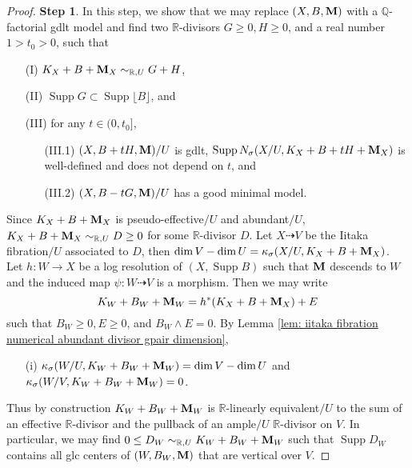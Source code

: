 \documentclass[11pt]{amsart}
\numberwithin{equation}{section}
\newcommand{\Mm}{{\bf{M}}}
\newcommand{\Qq}{\mathbb{Q}}
\newcommand{\Rr}{\mathbb{R}}
\newcommand{\Supp}{\operatorname{Supp}}
\theoremstyle{definition}
\theoremstyle{definition}
\theoremstyle{definition}
\begin{document}
\begin{proof}

\noindent\textbf{Step 1}. In this step, we show that we may replace $(X,B,\Mm)$ with a $\Qq$-factorial gdlt model and find two $\Rr$-divisors $G\geq 0,H\geq 0$, and a real number $1>t_0>0$, such that
\begin{itemize}
    \item[(I)] $K_X+B+\Mm_X\sim_{\Rr,U}G+H$,
    \item[(II)] $\Supp G\subset\Supp\lfloor B\rfloor$, and
    \item[(III)] for any $t\in (0,t_0]$,
    \begin{enumerate}
        \item[(III.1)] $(X,B+tH,\Mm)/U$ is gdlt, $\Supp N_{\sigma}(X/U,K_X+B+tH+\Mm_X)$ is well-defined and does not depend on $t$, and
        \item[(III.2)] $(X,B-tG,\Mm)/U$ has a good minimal model.
    \end{enumerate}
\end{itemize}

Since $K_X+B+\Mm_X$ is pseudo-effective$/U$ and abundant$/U$,  $K_{X}+B+\Mm_{X}\sim_{\Rr,U}D\geq 0$ for some $\Rr$-divisor $D$. Let $X\dashrightarrow V$ be the Iitaka fibration$/U$ associated to $D$, then $\dim V-\dim U=\kappa_{\sigma}(X/U,K_X+B+\Mm_X)$. Let $h: W\rightarrow X$ be a log resolution of $(X,\Supp B)$ such that $\Mm$ descends to $W$ and the induced map $\psi: W\dashrightarrow V$ is a morphism. Then we may write
$$K_W+B_W+\Mm_W=h^*(K_X+B+\Mm_X)+E$$
such that $B_W\geq 0,E\geq 0$, and $B_W\wedge E=0$. By Lemma \ref{lem: iitaka fibration numerical abundant divisor gpair dimension}, 
\begin{itemize}
    \item[(i)]  $\kappa_{\sigma}(W/U,K_{W}+B_W+\Mm_W)=\dim V-\dim U$ and $\kappa_{\sigma}(W/V,K_{W}+B_W+\Mm_{W})=0$. 
\end{itemize}
Thus by construction $K_{W}+B_W+\Mm_{W}$ is $\Rr$-linearly equivalent$/U$ to the sum of an effective $\Rr$-divisor and the pullback of an ample$/U$ $\Rr$-divisor on $V$. In particular, we may find $0\leq D_W\sim_{\Rr,U}K_W+B_W+\Mm_W$ such that $\Supp D_W$ contains all glc centers of $(W,B_W,\Mm)$ that are vertical over $V$. 


\end{proof}
\end{document}
